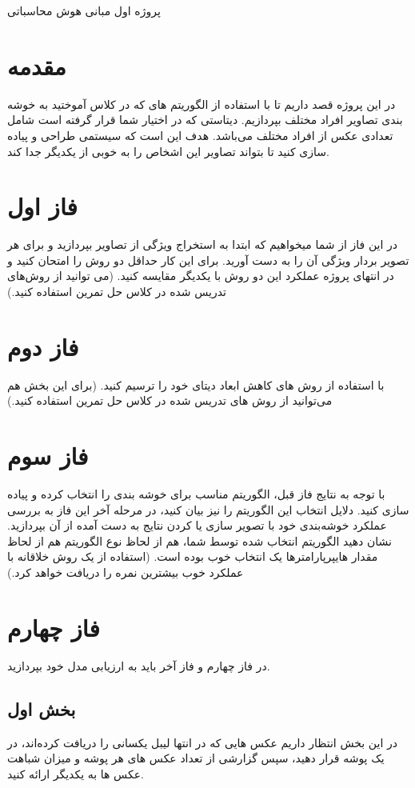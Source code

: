 \documentclass{article}
\begin{document}
	\begin{centering}
		\LARGE
		پروژه اول مبانی هوش محاسباتی \\
	\end{centering}
	\section*{مقدمه}
	در این پروژه قصد داریم تا با استفاده از الگوریتم های  که در کلاس آموختید به خوشه بندی تصاویر افراد مختلف بپردازیم. دیتاستی که در اختیار شما قرار گرفته است شامل تعدادی عکس از افراد مختلف می‌باشد. هدف این است که سیستمی طراحی و پیاده سازی کنید تا بتواند تصاویر این اشخاص را به خوبی از یکدیگر جدا کند.
	
	
	\section{فاز اول}
	در این فاز از شما میخواهیم که ابتدا به استخراج ویژگی‌ از تصاویر بپردازید و برای هر تصویر بردار ویژگی آن را به دست آورید. برای این کار حداقل دو روش را امتحان کنید و در انتهای پروژه عملکرد این دو روش با یکدیگر مقایسه کنید. (می توانید از روش‌های تدریس شده در کلاس حل تمرین استفاده کنید.)
	
	
	\section{فاز دوم}
	با استفاده از روش‌ های کاهش ابعاد دیتای خود را ترسیم کنید. (برای این بخش هم می‌توانید از روش ‌های تدریس شده در کلاس حل تمرین استفاده کنید.)
	
	\section{فاز سوم}
	با توجه به نتایج فاز قبل، الگوریتم مناسب برای خوشه بندی را انتخاب کرده و پیاده سازی کنید. دلایل انتخاب این الگوریتم را نیز بیان کنید، در مرحله آخر این فاز به بررسی عملکرد خوشه‌بندی خود با تصویر سازی یا  کردن نتایج به دست آمده از آن بپردازید. نشان دهید الگوریتم انتخاب شده توسط شما، هم از لحاظ نوع الگوریتم هم از لحاظ مقدار هایپرپارامترها یک انتخاب خوب بوده است. (استفاده از یک روش خلاقانه با عملکرد خوب بیشترین نمره را دریافت خواهد کرد.)
	
	\section{فاز چهارم}
	در فاز چهارم و فاز آخر باید به ارزیابی مدل خود بپردازید. 
	\subsection{بخش اول}
	در این بخش انتظار داریم عکس‌ ها‌یی که در انتها لیبل یکسانی را دریافت کرده‌اند، در یک پوشه قرار دهید، سپس گزارشی از تعداد عکس ‌های هر پوشه و میزان شباهت عکس ‌ها به یکدیگر ارائه کنید.
	
\end{document}
